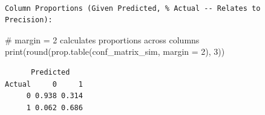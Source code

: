 \documentclass[
  letterpaper,
  DIV=11,
  numbers=noendperiod]{scrreprt}
\newenvironment{Shaded}{\begin{snugshade}}{\end{snugshade}}
\newcommand{\AttributeTok}[1]{\textcolor[rgb]{0.40,0.45,0.13}{#1}}
\newcommand{\CommentTok}[1]{\textcolor[rgb]{0.37,0.37,0.37}{#1}}
\newcommand{\DecValTok}[1]{\textcolor[rgb]{0.68,0.00,0.00}{#1}}
\newcommand{\FunctionTok}[1]{\textcolor[rgb]{0.28,0.35,0.67}{#1}}
\newcommand{\NormalTok}[1]{\textcolor[rgb]{0.00,0.23,0.31}{#1}}
\begin{document}
\begin{verbatim}

Column Proportions (Given Predicted, % Actual -- Relates to Precision):
\end{verbatim}

\begin{Shaded}
\begin{Highlighting}[]
\CommentTok{\# margin = 2 calculates proportions across columns}
\FunctionTok{print}\NormalTok{(}\FunctionTok{round}\NormalTok{(}\FunctionTok{prop.table}\NormalTok{(conf\_matrix\_sim, }\AttributeTok{margin =} \DecValTok{2}\NormalTok{), }\DecValTok{3}\NormalTok{))}
\end{Highlighting}
\end{Shaded}

\begin{verbatim}
      Predicted
Actual     0     1
     0 0.938 0.314
     1 0.062 0.686
\end{verbatim}
\end{document}
